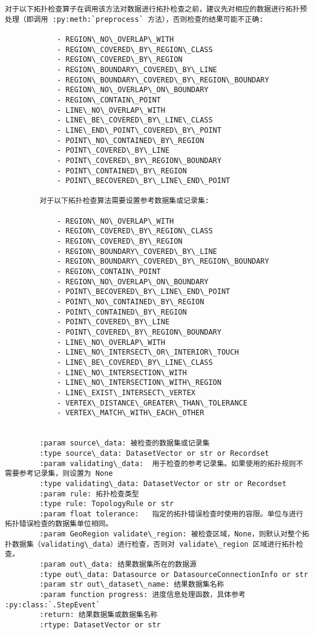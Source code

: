 \documentclass[11pt]{article}
\begin{document}
\begin{Verbatim}[commandchars=\\\{\}]
        对于以下拓扑检查算子在调用该方法对数据进行拓扑检查之前，建议先对相应的数据进行拓扑预处理（即调用 :py:meth:`preprocess` 方法），否则检查的结果可能不正确:
        
            - REGION\_NO\_OVERLAP\_WITH
            - REGION\_COVERED\_BY\_REGION\_CLASS
            - REGION\_COVERED\_BY\_REGION
            - REGION\_BOUNDARY\_COVERED\_BY\_LINE
            - REGION\_BOUNDARY\_COVERED\_BY\_REGION\_BOUNDARY
            - REGION\_NO\_OVERLAP\_ON\_BOUNDARY
            - REGION\_CONTAIN\_POINT
            - LINE\_NO\_OVERLAP\_WITH
            - LINE\_BE\_COVERED\_BY\_LINE\_CLASS
            - LINE\_END\_POINT\_COVERED\_BY\_POINT
            - POINT\_NO\_CONTAINED\_BY\_REGION
            - POINT\_COVERED\_BY\_LINE
            - POINT\_COVERED\_BY\_REGION\_BOUNDARY
            - POINT\_CONTAINED\_BY\_REGION
            - POINT\_BECOVERED\_BY\_LINE\_END\_POINT
        
        对于以下拓扑检查算法需要设置参考数据集或记录集:
        
            - REGION\_NO\_OVERLAP\_WITH
            - REGION\_COVERED\_BY\_REGION\_CLASS
            - REGION\_COVERED\_BY\_REGION
            - REGION\_BOUNDARY\_COVERED\_BY\_LINE
            - REGION\_BOUNDARY\_COVERED\_BY\_REGION\_BOUNDARY
            - REGION\_CONTAIN\_POINT
            - REGION\_NO\_OVERLAP\_ON\_BOUNDARY
            - POINT\_BECOVERED\_BY\_LINE\_END\_POINT
            - POINT\_NO\_CONTAINED\_BY\_REGION
            - POINT\_CONTAINED\_BY\_REGION
            - POINT\_COVERED\_BY\_LINE
            - POINT\_COVERED\_BY\_REGION\_BOUNDARY
            - LINE\_NO\_OVERLAP\_WITH
            - LINE\_NO\_INTERSECT\_OR\_INTERIOR\_TOUCH
            - LINE\_BE\_COVERED\_BY\_LINE\_CLASS
            - LINE\_NO\_INTERSECTION\_WITH
            - LINE\_NO\_INTERSECTION\_WITH\_REGION
            - LINE\_EXIST\_INTERSECT\_VERTEX
            - VERTEX\_DISTANCE\_GREATER\_THAN\_TOLERANCE
            - VERTEX\_MATCH\_WITH\_EACH\_OTHER
        
        
        :param source\_data: 被检查的数据集或记录集
        :type source\_data: DatasetVector or str or Recordset
        :param validating\_data:  用于检查的参考记录集。如果使用的拓扑规则不需要参考记录集，则设置为 None
        :type validating\_data: DatasetVector or str or Recordset
        :param rule: 拓扑检查类型
        :type rule: TopologyRule or str
        :param float tolerance:   指定的拓扑错误检查时使用的容限。单位与进行拓扑错误检查的数据集单位相同。
        :param GeoRegion validate\_region: 被检查区域，None，则默认对整个拓扑数据集（validating\_data）进行检查，否则对 validate\_region 区域进行拓扑检查。
        :param out\_data: 结果数据集所在的数据源
        :type out\_data: Datasource or DatasourceConnectionInfo or str
        :param str out\_dataset\_name: 结果数据集名称
        :param function progress: 进度信息处理函数，具体参考 :py:class:`.StepEvent`
        :return: 结果数据集或数据集名称
        :rtype: DatasetVector or str
    

\end{Verbatim}
\end{document}
